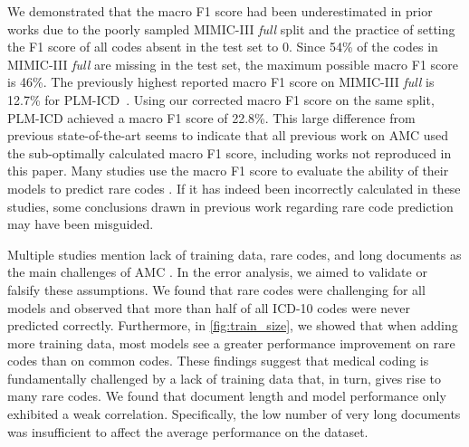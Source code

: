 {We demonstrated that the macro F1 score had been underestimated in prior works due to the poorly sampled MIMIC-III \textit{full} split and the practice of setting the F1 score of all codes absent in the test set to 0. Since 54\% of the codes in MIMIC-III \textit{full} are missing in the test set, the maximum possible macro F1 score is 46\%. The previously highest reported macro F1 score on MIMIC-III \textit{full} is 12.7\% for PLM-ICD~\parencite{kimReadAttendCode2021}. Using our corrected macro F1 score on the same split, PLM-ICD achieved a macro F1 score of 22.8\%. This large difference from previous state-of-the-art seems to indicate that all previous work on AMC used the sub-optimally calculated macro F1 score, including works not reproduced in this paper. Many studies use the macro F1 score to evaluate the ability of their models to predict rare codes \parencite{kimReadAttendCode2021, yuanCodeSynonymsMatter2022}. If it has indeed been incorrectly calculated in these studies, some conclusions drawn in previous work regarding rare code prediction may have been misguided.

Multiple studies mention lack of training data, rare codes, and long documents as the main challenges of AMC \parencite{dongExplainableAutomatedCoding2021,feuchtDescriptionbasedLabelAttention2021,huangPLMICDAutomaticICD2022,jiDoesMagicBERT2021,liICDCodingClinical2020,liuEffectiveConvolutionalAttention2021,moonsComparisonDeepLearning2020,pascualBERTbasedAutomaticICD2021,tengReviewDeepNeural2022,tengExplainablePredictionMedical2020, vuLabelAttentionModel2020, venkateshAutomatingOverburdenedClinical2023}. In the error analysis, we aimed to validate or falsify these assumptions. We found that rare codes were challenging for all models and observed that more than half of all ICD-10 codes were never predicted correctly. Furthermore, in \cref{fig:train_size}, we showed that when adding more training data, most models see a greater performance improvement on rare codes than on common codes. 
These findings suggest that medical coding is fundamentally challenged by a lack of training data that, in turn, gives rise to many rare codes.
We found that document length and model performance only exhibited a weak correlation. Specifically, the low number of very long documents was insufficient to affect the average performance on the dataset. 

}
